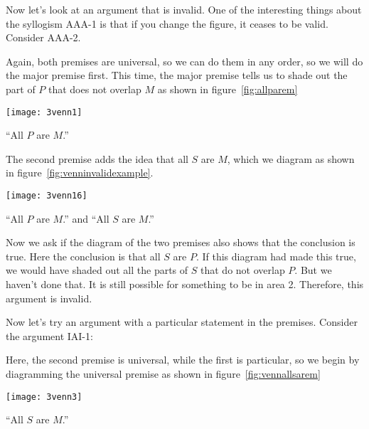 Now let's look at an argument that is invalid. One of the interesting things about the syllogism AAA-1 is that if you change the figure, it ceases to be valid. Consider AAA-2.

\begin{kormanize}
\end{kormanize}

Again, both premises are universal, so we can do them in any order, so we will do the major premise first. This time, the major premise tells us to shade out the part of $P$ that does not overlap $M$ as shown in figure~\ref{fig:allparem}

\begin{marginfigure}
\texttt{[image: 3venn1]}
\caption{``All $P$ are $M$.''}
\label{fig:allparem}
\end{marginfigure}

The second premise adds the idea that all $S$ are $M$, which we diagram as shown in figure~\ref{fig:venninvalidexample}.

\begin{marginfigure}
\texttt{[image: 3venn16]}
\caption{``All $P$ are $M$.'' and ``All $S$ are $M$.''}
\label{fig:venninvalidexample}
\end{marginfigure}

Now we ask if the diagram of the two premises also shows that the conclusion is true. Here the conclusion is that all $S$ are $P$. If this diagram had made this true, we would have shaded out all the parts of $S$ that do not overlap $P$. But we haven't done that. It is still possible for something to be in area 2. Therefore, this argument is invalid.

\newpage

Now let's try an argument with a particular statement in the premises. Consider the argument IAI-1:

\begin{kormanize}
\end{kormanize}

Here, the second premise is universal, while the first is particular, so we begin by diagramming the universal premise as shown in figure~\ref{fig:vennallsarem}

\begin{marginfigure}
\texttt{[image: 3venn3]}
\caption{``All $S$ are $M$.''}
\label{fig:vennallsarem}
\end{marginfigure}

